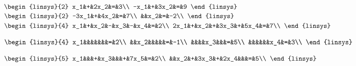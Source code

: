 \begin{Answer}
\Question 
$
\begin{linsys}{2}
x_1&+&2x_2&=&3\\
-x_1&+&3x_2&=&9
\end{linsys}
$
\Question 
$
\begin{linsys}{2}
-3x_1&+&4x_2&=&7\\
&&x_2&=&-2\\
\end{linsys}
$
\Question
$
\begin{linsys}{4}
x_1&+&x_2&-&x_3&-&x_4&=&2\\
2x_1&+&x_2&+&3x_3&+&5x_4&=&7\\
\end{linsys}
$

\Question
$
\begin{linsys}{4}
x_1&&&&&&&=&2\\
&&x_2&&&&&=&-1\\
&&&&x_3&&&=&5\\
&&&&&&x_4&=&3\\
\end{linsys}
$

\Question
$
\begin{linsys}{5}
x_1&&&+&x_3&&&+&7x_5&=&2\\
&&x_2&+&3x_3&+&2x_4&&&=&5\\
\end{linsys}
$

\end{Answer}
